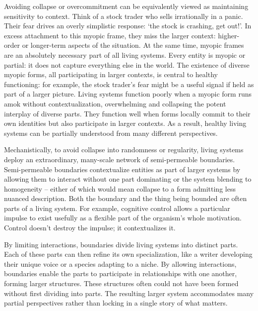 \documentclass[12pt]{article}
\begin{document}

Avoiding collapse or overcommitment can be equivalently viewed as maintaining sensitivity to context. Think of a stock trader who sells irrationally in a panic. Their fear drives an overly simplistic response: `the stock is crashing, get out!'. In excess attachment to this myopic frame, they miss the larger context: higher-order or longer-term aspects of the situation. At the same time, myopic frames are an absolutely necessary part of all living systems. Every entity is myopic or partial: it does not capture everything else in the world. The existence of diverse myopic forms, all participating in larger contexts, is central to healthy functioning: for example, the stock trader's fear might be a useful signal if held as part of a larger picture. Living systems function poorly when a myopic form runs amok without contextualization, overwhelming and collapsing the potent interplay of diverse parts. They function well when forms locally commit to their own identities but also participate in larger contexts. As a result, healthy living systems can be partially understood from many different perspectives.

Mechanistically, to avoid collapse into randomness or regularity, living systems deploy an extraordinary, many-scale network of semi-permeable boundaries. Semi-permeable boundaries contextualize entities as part of larger systems by allowing them to interact without one part dominating or the system blending to homogeneity -- either of which would mean collapse to a form admitting less nuanced description. Both the boundary and the thing being bounded are often parts of a living system. For example, cognitive control allows a particular impulse to exist usefully as a flexible part of the organism's whole motivation. Control doesn't destroy the impulse; it contextualizes it. 

By limiting interactions, boundaries divide living systems into distinct parts. Each of these parts can then refine its own specialization, like a writer developing their unique voice or a species adapting to a niche. By allowing interactions, boundaries enable the parts to participate in relationships with one another, forming larger structures. These structures often could not have been formed without first dividing into parts. The resulting larger system accommodates many partial perspectives rather than locking in a single story of what matters. 

\end{document}
